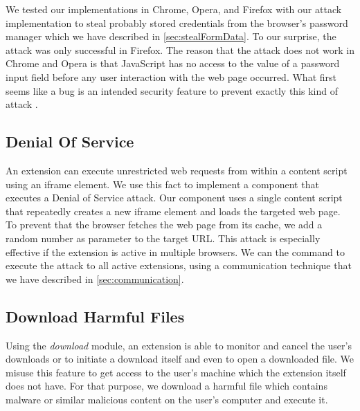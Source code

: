 	We tested our implementations in Chrome, Opera, and Firefox with our attack implementation to steal probably stored credentials from the browser's password manager which we have described in \autoref{sec:stealFormData}. To our surprise, the attack was only successful in Firefox. The reason that the attack does not work in Chrome and Opera is that JavaScript has no access to the value of a password input field before any user interaction with the web page occurred. What first seems like a bug is an intended security feature to prevent exactly this kind of attack \cite{chromiumBlogPasswordInput}.


\subsection{Denial Of Service}
\label{sec:DoS}
	
	An extension can execute unrestricted web requests from within a content script using an iframe element. We use this fact to implement a component that executes a Denial of Service attack. Our component uses a single content script that repeatedly creates a new iframe element and loads the targeted web page. To prevent that the browser fetches the web page from its cache, we add a random number as parameter to the target URL. This attack is especially effective if the extension is active in multiple browsers. We can the command to execute the attack to all active extensions, using a communication technique that we have described in \autoref{sec:communication}.

\subsection{Download Harmful Files}
\label{sec:downloads}

	Using the \textit{download} module, an extension is able to monitor and cancel the user's downloads or to initiate a download itself and even to open a downloaded file. We misuse this feature to get access to the user's machine which the extension itself does not have. For that purpose, we download a harmful file which contains malware or similar malicious content on the user's computer and execute it. 
	
